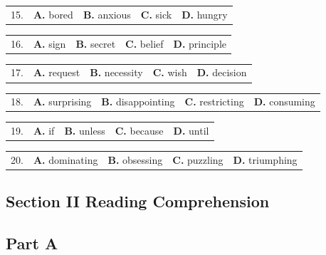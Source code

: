 \documentclass[UTF8,11pt]{ctexart}
\begin{document}
\noindent\begin{tabularx}{\linewidth}{@{}lXXXX@{}}15. & \textbf{A.} bored & \textbf{B.} anxious & \textbf{C.} sick & \textbf{D.} hungry\\\end{tabularx}\par

\noindent\begin{tabularx}{\linewidth}{@{}lXXXX@{}}16. & \textbf{A.} sign & \textbf{B.} secret & \textbf{C.} belief & \textbf{D.} principle\\\end{tabularx}\par

\noindent\begin{tabularx}{\linewidth}{@{}lXXXX@{}}17. & \textbf{A.} request & \textbf{B.} necessity & \textbf{C.} wish & \textbf{D.} decision\\\end{tabularx}\par

\noindent\begin{tabularx}{\linewidth}{@{}lXXXX@{}}18. & \textbf{A.} surprising & \textbf{B.} disappointing & \textbf{C.} restricting & \textbf{D.} consuming\\\end{tabularx}\par

\noindent\begin{tabularx}{\linewidth}{@{}lXXXX@{}}19. & \textbf{A.} if & \textbf{B.} unless & \textbf{C.} because & \textbf{D.} until\\\end{tabularx}\par

\noindent\begin{tabularx}{\linewidth}{@{}lXXXX@{}}20. & \textbf{A.} dominating & \textbf{B.} obsessing & \textbf{C.} puzzling & \textbf{D.} triumphing\\\end{tabularx}\par

\subsection*{\textbf{Section II Reading Comprehension}}


\subsection*{\textbf{Part A}}
\end{document}
